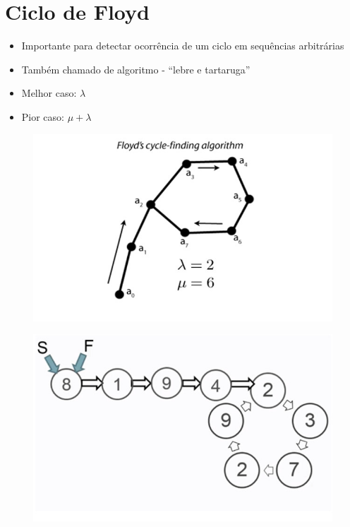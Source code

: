 \documentclass{beamer}
\begin{document}
\section{Ciclo de Floyd}
\begin{frame}
  \begin{itemize}
    \item Importante para detectar ocorrência de um ciclo em sequências arbitrárias
    \item Também chamado de algoritmo - ``lebre e tartaruga''
    \item Melhor caso: $\lambda$
    \item Pior caso: $\mu + \lambda$
  \end{itemize}

  \begin{figure}
    \includegraphics[scale=0.2]{floyd_cycle}
  \end{figure}
\end{frame}
\begin{frame}
  \begin{figure}
    \includegraphics[scale=0.3]{floyd_step1}
  \end{figure}
\end{frame}
\end{document}
